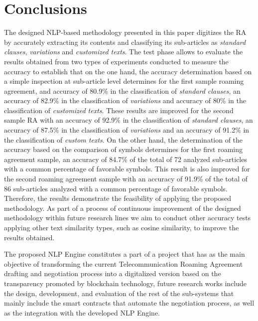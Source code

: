 \section{Conclusions}\label{conclusions}
The designed NLP-based methodology presented in this paper digitizes the RA by accurately extracting its contents and classifying its sub-articles as \textit{standard clauses}, \textit{variations} and \textit{customized texts}. The test phase allows to evaluate the results obtained from two types of experiments conducted to measure the accuracy to establish that on the one hand, the accuracy determination based on a simple inspection at sub-article level determines for the first sample roaming agreement, and accuracy of 80.9\% in the classification of \textit{standard clauses}, an accuracy of 82.9\% in the classification of \textit{variations} and accuracy of 80\% in the classification of \textit{customized texts}. These results are improved for the second sample RA with an accuracy of 92.9\% in the classification of \textit{standard clauses}, an accuracy of 87.5\% in the classification of \textit{variations} and an accuracy of 91.2\% in the classification of \textit{custom texts}. On the other hand, the determination of the accuracy based on the comparison of symbols determines for the first roaming agreement sample, an accuracy of 84.7\% of the total of 72 analyzed sub-articles with a common percentage of favorable symbols. This result is also improved for the second roaming agreement sample with an accuracy of 91.9\% of the total of 86 sub-articles analyzed with a common percentage of favorable symbols. Therefore, the results demonstrate the feasibility of applying the proposed methodology. As part of a process of continuous improvement of the designed methodology within future research lines we aim to conduct other accuracy tests applying other text similarity types, such as cosine similarity, to improve the results obtained.

The proposed NLP Engine constitutes a part of a project that has as the main objective of transforming the current Telecommunication Roaming Agreement drafting and negotiation process into a digitalized version based on the transparency promoted by blockchain technology, future research works include the design, development, and evaluation of the rest of the sub-systems that mainly include the smart contracts that automate the negotiation process, as well as the integration with the developed NLP Engine.